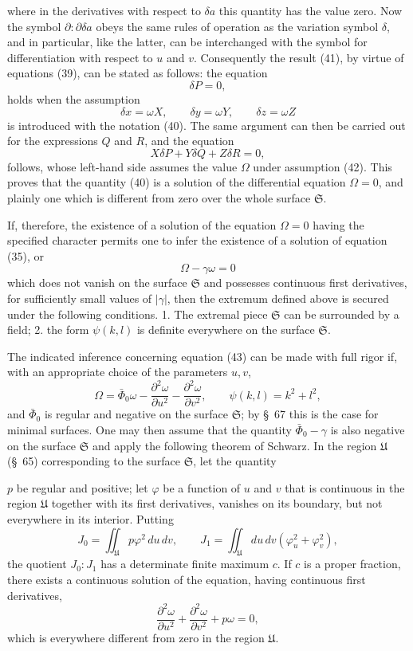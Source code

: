 \documentclass[11pt,a4paper,leqno]{article}
\begin{document}
where in the derivatives with respect to $\delta a$ this quantity has the
value zero. Now the symbol $\partial:\partial\delta a$ obeys the same rules
of operation as the variation symbol $\delta$, and in particular, like the
latter, can be interchanged with the symbol for differentiation with respect
to $u$ and $v$. Consequently the result (41), by virtue of equations (39),
can be stated as follows: the equation
\[
\delta P=0,
\]
holds when the assumption
\begin{equation}\tag{42}
\delta x=\omega X,\qquad \delta y=\omega Y,\qquad \delta z=\omega Z
\end{equation}
is introduced with the notation (40). The same argument can then be carried
out for the expressions $Q$ and $R$, and the equation
\[
X\delta P+Y\delta Q+Z\delta R=0,
\]
follows, whose left-hand side assumes the value $\Omega$ under assumption
(42). This proves that the quantity (40) is a solution of the differential
equation $\Omega=0$, and plainly one which is different from zero over the
whole surface $\mathfrak{S}$.

If, therefore, the existence of a solution of the equation $\Omega=0$ having
the specified character permits one to infer the existence of a solution of
equation (35), or
\begin{equation}\tag{43}
\Omega-\gamma\omega=0
\end{equation}
which does not vanish on the surface $\mathfrak{S}$ and possesses continuous
first derivatives, for sufficiently small values of $|\gamma|$, then the
extremum defined above is secured under the following conditions. 1. The
extremal piece $\mathfrak{S}$ can be surrounded by a field; 2. the form
$\psi(k,l)$ is definite everywhere on the surface $\mathfrak{S}$.

The indicated inference concerning equation (43) can be made with full rigor
if, with an appropriate choice of the parameters $u,v$,
\[
\Omega=\bar\Phi_0\omega-\frac{\partial^2\omega}{\partial u^2}
-\frac{\partial^2\omega}{\partial v^2},\qquad
\psi(k,l)=k^2+l^2,
\]
and $\bar\Phi_0$ is regular and negative on the surface $\mathfrak{S}$; by
\S~67 this is the case for minimal surfaces. One may then assume that the
quantity $\bar\Phi_0-\gamma$ is also negative on the surface $\mathfrak{S}$
and apply the following theorem of Schwarz. In the region $\mathfrak{U}$
(\S~65) corresponding to the surface $\mathfrak{S}$, let the quantity

$p$ be regular and positive; let $\varphi$ be a function of $u$ and $v$ that
is continuous in the region $\mathfrak{U}$ together with its first
derivatives, vanishes on its boundary, but not everywhere in its interior.
Putting
\[
J_0=\iint_{\mathfrak{U}}p\varphi^2\,du\,dv,\qquad
J_1=\iint_{\mathfrak{U}}du\,dv(\varphi_u^2+\varphi_v^2),
\]
the quotient $J_0:J_1$ has a determinate finite maximum $c$. If $c$ is a
proper fraction, there exists a continuous solution of the equation, having
continuous first derivatives,
\[
\frac{\partial^2\omega}{\partial u^2}
+\frac{\partial^2\omega}{\partial v^2}+p\omega=0,
\]
which is everywhere different from zero in the region $\mathfrak{U}$.
\end{document}
